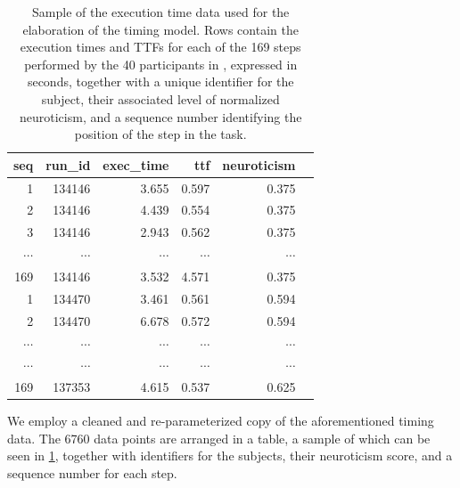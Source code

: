 \begin{table}
    \centering
    \caption[A]{%
        Sample of the execution time data  used for the elaboration of the timing model.
        Rows contain the execution times and \acp{TTF} for each of the \num{169} steps performed by the \num{40} participants in \textcite{olguinmunoz:impact2021}, expressed in seconds, together with a unique identifier for the subject, their associated level of normalized neuroticism, and a sequence number identifying the position of the step in the task.
    }\label{tab:data:exectime}
    \begin{tabular}{rrrrrr}
        \toprule
        {seq}        & {run\_id}    & {exec\_time} & {ttf}        & {neuroticism} \\
        \midrule
        1            & 134146       & 3.655        & 0.597        & 0.375         \\
        2            & 134146       & 4.439        & 0.554        & 0.375         \\
        3            & 134146       & 2.943        & 0.562        & 0.375         \\
        \( \cdots \) & \( \cdots \) & \( \cdots \) & \( \cdots \) & \( \cdots \)  \\
        169          & 134146       & 3.532        & 4.571        & 0.375         \\
        1            & 134470       & 3.461        & 0.561        & 0.594         \\
        2            & 134470       & 6.678        & 0.572        & 0.594         \\
        \( \cdots \) & \( \cdots \) & \( \cdots \) & \( \cdots \) & \( \cdots \)  \\
        \( \cdots \) & \( \cdots \) & \( \cdots \) & \( \cdots \) & \( \cdots \)  \\
        169          & 137353       & 4.615        & 0.537        & 0.625         \\
        \bottomrule
    \end{tabular}
\end{table}

We employ a cleaned and re-parameterized copy of the aforementioned timing data.
The \num{6760} data points are arranged in a table, a sample of which can be seen in \cref{tab:data:exectime}, together with identifiers for the subjects, their neuroticism score, and a sequence number for each step.


